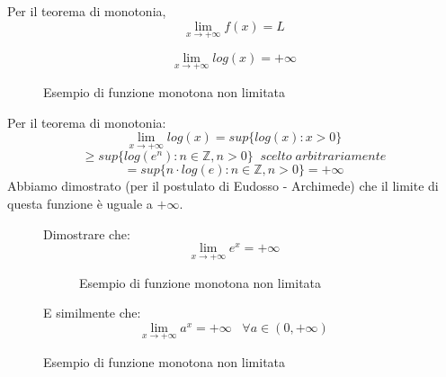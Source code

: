 \documentclass[a4paper]{article}
\theoremstyle{break}
\theoremstyle{break}
\theoremstyle{break}
\theoremstyle{break}
\begin{document}
Per il teorema di monotonia, \[
	\lim_{x \to +\infty} f(x) = L
\]
\begin{example}
	\[
		\lim_{x \to +\infty} log(x) = +\infty
	\]
	\begin{figure}[H]
		\begin{center}
		\end{center}
		\caption{Esempio di funzione monotona non limitata}
	\end{figure}
	Per il teorema di monotonia:
	\[
		\lim_{x \to +\infty} log(x) = sup\{ log(x): x>0 \}
	\]
	\[
		\ge sup\{ log(e^n): n \in \mathbb{Z}, n>0 \}\;\;scelto\;arbitrariamente
	\]
	\[
		= sup\{ n \cdot log(e): n \in \mathbb{Z}, n>0 \} = +\infty
	\]
	Abbiamo dimostrato (per il postulato di Eudosso - Archimede) che il limite di questa
	funzione è uguale a \( +\infty \).
\end{example}
\begin{figure}[H]
	\begin{exercise}
		Dimostrare che:
		\[
			\lim_{x \to +\infty} e^x = +\infty
		\]
		\begin{figure}[H]
			\begin{center}
			\end{center}
			\caption{Esempio di funzione monotona non limitata}
		\end{figure}
		E similmente che:
		\[
			\lim_{x \to +\infty} a^x = +\infty\;\;\;\forall a \in (0,+\infty)
		\]
	\end{exercise}
\end{figure}
\end{document}
